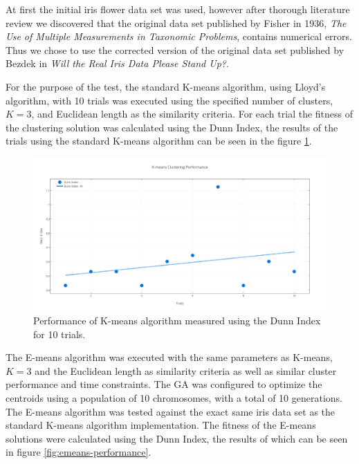 \documentclass{article}
\begin{document}
At first the initial iris flower data set was used, however after thorough literature review we discovered that the original data set published by Fisher in 1936, \emph{The Use of Multiple Measurements in Taxonomic Problems}\cite{fisher1936use}, contains numerical errors. Thus we chose to use the corrected version of the original data set published by Bezdek in \emph{Will the Real Iris Data Please Stand Up?}\cite{bezdek1999will}.

For the purpose of the test, the standard K-means algorithm, using Lloyd's algorithm, with 10 trials was executed using the specified number of clusters, $K = 3$, and Euclidean length as the similarity criteria. For each trial the fitness of the clustering solution was calculated using the Dunn Index, the results of the trials using the standard K-means algorithm can be seen in the figure \ref{fig:kmeans-performance}.

\begin{figure}[H]
\centering
\includegraphics[width=\textwidth]{figures/kmeans-performance}
\caption{Performance of K-means algorithm measured using the Dunn Index for 10 trials.}
\label{fig:kmeans-performance}
\end{figure}

The E-means algorithm was executed with the same parameters as K-means, $K = 3$ and the Euclidean length as similarity criteria as well as similar cluster performance and time constraints. The GA was configured to optimize the centroids using a population of 10 chromosomes, with a total of 10 generations. The E-means algorithm was tested against the exact same iris data set as the standard K-means algorithm implementation. The fitness of the E-means solutions were calculated using the Dunn Index, the results of which can be seen in figure \ref{fig:emeans-performance}.
\end{document}
